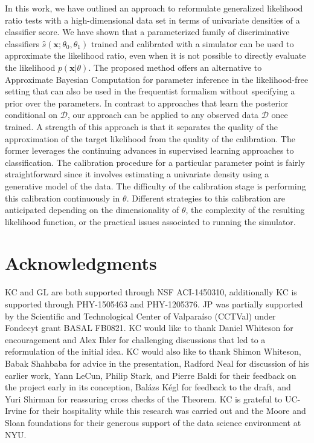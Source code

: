 \documentclass[12pt]{article}
\numberwithin{equation}{section}
\theoremstyle{plain}
\begin{document}
In this work, we have outlined an approach to reformulate generalized likelihood
ratio tests with a high-dimensional data set in terms of univariate densities
of a classifier score. We have shown that a parameterized family of
discriminative classifiers $\hat s(\mathbf{x}; \theta_0, \theta_1)$ trained and
calibrated with a simulator can be used to approximate the likelihood ratio,
even when it is not possible to directly evaluate the likelihood
$p(\mathbf{x}|\theta)$.
The proposed method offers an alternative to Approximate Bayesian Computation
for parameter inference in the likelihood-free setting that can also be used in
the frequentist formalism without specifying a prior over the parameters. 
In contrast to approaches that learn the posterior conditional on $\mathcal{D}$, our
approach can be applied to any observed data $\mathcal{D}$ once trained.
A strength of this approach is that it separates the quality of the approximation
of the target likelihood from the quality of the calibration. The former
leverages the continuing advances in supervised learning approaches to classification. 
The calibration procedure for a particular
parameter point is fairly straightforward since it involves estimating a
univariate density using a generative model of the data. The difficulty of the
calibration stage is performing this calibration continuously in $\theta$.
Different strategies to this calibration are anticipated depending on the
dimensionality of $\theta$, the complexity of the resulting likelihood function,
or the practical issues associated to running the simulator.

\section*{Acknowledgments} KC and GL are both supported through NSF ACI-1450310, 
additionally KC is supported through PHY-1505463 and PHY-1205376.
JP was partially supported by the Scientific and Technological Center of Valpara\'iso (CCTVal) under Fondecyt grant BASAL FB0821.
KC would like to thank Daniel Whiteson for
encouragement and Alex Ihler for challenging discussions
that  led to a reformulation of the initial idea. KC would also like to thank
Shimon Whiteson, Babak Shahbaba for advice in the presentation, Radford Neal for
discussion of his earlier work, Yann LeCun, Philip Stark, and Pierre Baldi for
their feedback on the project early in its conception, Bal\'azs K\'egl for
feedback to the draft,  and Yuri
Shirman for reassuring cross checks of the Theorem.   KC is grateful
to UC-Irvine for their hospitality while this research was carried out and the
Moore and Sloan foundations for their generous support of the data science
environment at NYU.
\end{document}
